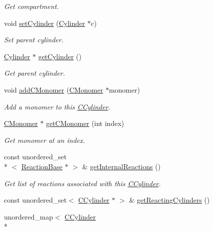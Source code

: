 \begin{DoxyCompactItemize}
\begin{DoxyCompactList}\small\item\em Get compartment. \end{DoxyCompactList}\item 
void \hyperlink{classCCylinder_a8a0a3292e299521278152921ebfbce51}{set\+Cylinder} (\hyperlink{classCylinder}{Cylinder} $\ast$c)
\begin{DoxyCompactList}\small\item\em Set parent cylinder. \end{DoxyCompactList}\item 
\hyperlink{classCylinder}{Cylinder} $\ast$ \hyperlink{classCCylinder_a53332923a74acb20fe192d870215a687}{get\+Cylinder} ()
\begin{DoxyCompactList}\small\item\em Get parent cylinder. \end{DoxyCompactList}\item 
void \hyperlink{classCCylinder_a14fb0bbed36384ea72519e85ad4e91b8}{add\+C\+Monomer} (\hyperlink{classCMonomer}{C\+Monomer} $\ast$monomer)
\begin{DoxyCompactList}\small\item\em Add a monomer to this \hyperlink{classCCylinder}{C\+Cylinder}. \end{DoxyCompactList}\item 
\hyperlink{classCMonomer}{C\+Monomer} $\ast$ \hyperlink{classCCylinder_ac6b0fb293c40045db64365debca77c1d}{get\+C\+Monomer} (int index)
\begin{DoxyCompactList}\small\item\em Get monomer at an index. \end{DoxyCompactList}\item 
const unordered\+\_\+set\\*
$<$ \hyperlink{classReactionBase}{Reaction\+Base} $\ast$ $>$ \& \hyperlink{classCCylinder_a2bccfcdda7d524213d87066d1735fec9}{get\+Internal\+Reactions} ()
\begin{DoxyCompactList}\small\item\em Get list of reactions associated with this \hyperlink{classCCylinder}{C\+Cylinder}. \end{DoxyCompactList}\item 
const unordered\+\_\+set$<$ \hyperlink{classCCylinder}{C\+Cylinder} $\ast$ $>$ \& \hyperlink{classCCylinder_ac495877eae9e12fe90a9f4f85323d13f}{get\+Reacting\+Cylinders} ()
\item 
unordered\+\_\+map$<$ \hyperlink{classCCylinder}{C\+Cylinder} \\*

\end{DoxyCompactItemize}
